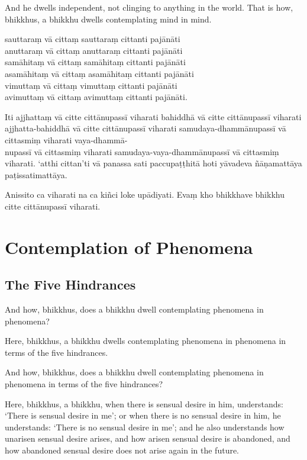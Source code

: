 And he dwells independent, not clinging to anything in the world. That is how,
bhikkhus, a bhikkhu dwells contemplating mind in mind.


\paliPage

sauttaraṃ vā cittaṃ sauttaraṃ cittanti pajānāti\\
anuttaraṃ vā cittaṃ anuttaraṃ cittanti pajānāti\\
samāhitaṃ vā cittaṃ samāhitaṃ cittanti pajānāti\\
asamāhitaṃ vā cittaṃ asamāhitaṃ cittanti pajānāti\\
vimuttaṃ vā cittaṃ vimuttaṃ cittanti pajānāti\\
avimuttaṃ vā cittaṃ avimuttaṃ cittanti pajānāti.

Iti ajjhattaṃ vā citte cittānupassī viharati bahiddhā vā citte cittānupassī
viharati ajjhatta-bahiddhā vā citte cittānupassī viharati samudaya-dhammānupassī
vā cittasmiṃ viharati vaya-dhammā-\\
nupassī vā cittasmiṃ viharati samudaya-vaya-dhammānupassī vā cittasmiṃ viharati.
`atthi cittan'ti vā panassa sati paccupaṭṭhitā hoti yāvadeva ñāṇamattāya
paṭissatimattāya.

Anissito ca viharati na ca kiñci loke upādiyati. Evaṃ kho bhikkhave bhikkhu
citte cittānupassī viharati.


\englishPage

\paliPage

\englishPage
\chapter{Contemplation of Phenomena}

\section{The Five Hindrances}

And how, bhikkhus, does a bhikkhu dwell contemplating phenomena in phenomena?

Here, bhikkhus, a bhikkhu dwells contemplating phenomena in phenomena in terms
of the five hindrances.

And how, bhikkhus, does a bhikkhu dwell contemplating phenomena in phenomena in
terms of the five hindrances?

Here, bhikkhus, a bhikkhu,
when there is sensual desire in him, understands:
`There is sensual desire in me';
or when there is no sensual desire in him, he understands:
`There is no sensual desire in me';
and he also understands how unarisen sensual desire arises,
and how arisen sensual desire is abandoned,
and how abandoned sensual desire does not arise again in the future.

